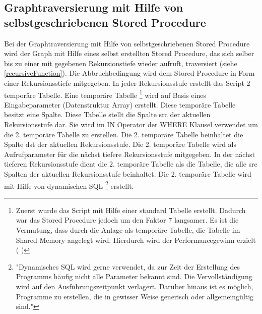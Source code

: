 \subsection{Graphtraversierung mit Hilfe von selbstgeschriebenen Stored Procedure}
\label{postgresRecursiveFunction}
Bei der Graphtraversierung mit Hilfe von selbstgeschriebenen Stored Procedure wird der Graph mit Hilfe eines selbst erstellten Stored Procedure, das sich selber bis
zu einer mit gegebenen Rekursionstiefe wieder aufruft, traversiert (siehe \ref{recursiveFunction}). Die Abbruchbedingung wird dem Stored Procedure in Form einer
Rekursionsstiefe mitgegeben. In jeder Rekursionsstufe erstellt das Script 2 temporäre Tabelle. Eine temporäre Tabelle \footnote{Zuerst wurde das Script mit Hilfe einer standard Tabelle
erstellt. Dadurch war das Stored Procedure jedoch um den Faktor 7 langsamer. Es ist die Vermutung, dass durch die Anlage als temporäre Tabelle, die Tabelle im Shared Memory angelegt wird.
Hierdurch wird der Performancegewinn erzielt ( \cite[S.26]{froehlich01})}
wird auf Basis eines Eingabeparameter (Datenstruktur Array) erstellt.
Diese temporäre Tabelle besitzt eine Spalte. Diese Tabelle stellt die Spalte src der aktuellen Rekursionsstufe dar. Sie wird im IN Operator der WHERE Klausel verwendet
um die 2. temporäre Tabelle zu erstellen. Die 2. temporäre Tabelle beinhaltet die Spalte dst der aktuellen Rekursionsstufe. Die 2. temporäre Tabelle wird als
Aufrufparameter für die nächst tiefere Rekursionsstufe mitgegeben. In der nächst tieferen Rekursionsstufe dient die 2. temporäre Tabelle als die Tabelle, die alle
src Spalten der aktuellen Rekursionsstufe beinhaltet. Die 2. temporäre Tabelle wird mit Hilfe von dynamischen \ac{SQL} \footnote{"Dynamisches SQL wird gerne verwendet,
da zur Zeit der Erstellung des Programms häufig nicht alle Parameter bekannt sind. Die Vervollständigung wird auf den Ausführungszeitpunkt verlagert. Darüber hinaus
ist es möglich, Programme zu erstellen, die in gewisser Weise generisch oder allgemeingültig sind."\cite[S.316 - 317]{froehlich01}} erstellt.

